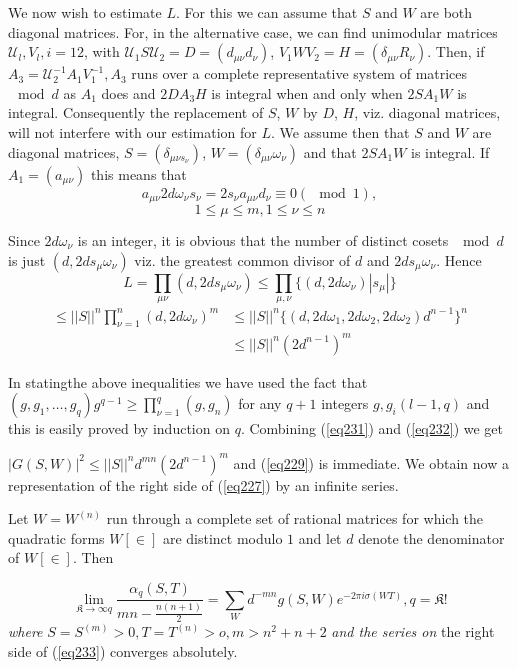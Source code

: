 We now wish to estimate $L$. For this we can assume that $S$ and $W$
are both diagonal matrices. For, in the alternative case, we can find
unimodular matrices $\mathcal{U}_l,V_l, i  = 12$, with
$\mathcal{U}_1 S \mathcal{U}_2 = D = (d_{\mu \nu}d_\nu)$, $V_1 W V_2 = H
= (\delta_{\mu \nu} R_\nu)$. Then, if $A_3 = \mathcal{U}^{-1}_{2} A_1
V^{-1}_1, A_3$ runs over a complete representative system of matrices
$\mod d$ as $A_1$ does and $2 DA_3 H$ is integral when and only when
$2 SA_1 W$ is integral. Consequently the replacement of $S$, $W$ by $D$,
$H$, viz. diagonal matrices, will not interfere with our estimation for
$L$. We assume then that $S$ and $W$ are diagonal matrices, $S=
(\delta_{\mu \nu s_\nu})$, $W = (\delta_{\mu \nu} \omega_\nu)$ and that
$2S A_1 W$ is integral. If $A_1 = (a_{\mu \nu})$ this means that  
$$
a_{\mu \nu} 2 d \omega_\nu s_\nu = 2 s_\nu a_{\mu \nu} d_\nu \equiv 0
(\mod 1), 
$$
$$
1 \le \mu \le m, 1 \le \nu \le n
$$

Since $2 d \omega_\nu$ is an integer, it is obvious that the number of
distinct cosets $\mod d$ is just $(d, 2 d s_\mu \omega_\nu)$ viz. the
greatest common divisor of $d$ and $2 d s_\mu \omega_\nu$. Hence 
$$
L = \prod_{\mu \nu} (d, 2 d s_\mu \omega_\nu) \le \prod_{\mu, \nu}
\{(d, 2 d \omega_\nu)|s_\mu|\} 
$$
\begin{align*}
\le || S ||^n \prod^n_{\nu  = 1} (d, 2 d \omega_\nu)^m & \le ||S||^n
\{(d, 2 d \omega_1, 2 d \omega_2, 2 d \omega_2 )d^{n-1} \}^n\\ 
& \le ||S||^n (2 d^{n-1})^m \tag{232}\label{eq232} 
\end{align*}

In stating\pageoriginale the above inequalities we have used the fact that\\
$(g, g_1, 
\ldots, g_q)g^{q-1} \ge \prod^q_{\nu =1} (g, g_n)$ for any $q+1$
integers $g, g_i (l - 1, q)$ and this is easily proved by induction on
$q$. Combining (\ref{eq231}) and (\ref{eq232}) we get 

$|G (S, W)|^2 \le ||S||^n d^{m n} (2 d^{n-1})^m$ and (\ref{eq229}) is
immediate. We obtain now a representation of the right side of (\ref{eq227})
by an infinite series. 

\begin{lem}\label{chap13:lem20}%
 Let $W = W^{(n)}$ run through a complete set of rational matrices
  for which the quadratic forms $W[\in]$ are distinct modulo
  $1$ and let $d$ denote the denominator of $W[\in]$. Then 
\end{lem}
\begin{equation*}
\lim_{\mathfrak{K} \to \infty q} \frac{\alpha_q (S, T)}{mn - \frac{n(n+1)}{2}} =
\sum_W d^{-mn} g(S, W) e^{-2 \pi i \sigma (W T)}, q = \mathfrak{K}!
\tag{233}\label{eq233}   
\end{equation*}
\textit{where } $S = S^{(m)} > 0, T = T^{(n)} > o, m > n^2 + n + 2$
\textit{and the series on} the right side of (\ref{eq233}) converges
absolutely. 

